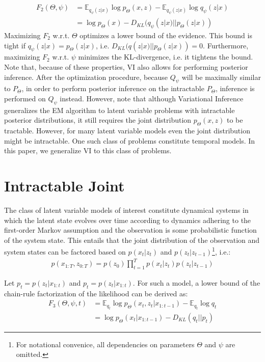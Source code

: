 \begin{align*}
F_{2}(\Theta, \psi) &= \mathbb{E}_{q_\psi(z|x)} \log p_\Theta(x,z) - \mathbb{E}_{q_\psi(z|x)} \log q_\psi(z|x)\\
&=  \log p_\Theta(x) - D_{KL}(q_\psi(z|x) || p_\Theta(z|x))
\end{align*}
Maximizing $F_2$ w.r.t. $\Theta$ optimizes a lower bound of the evidence. This bound is tight if  $q_\psi(z|x)=p_\Theta(z|x)$, i.e. $D_{KL}(q(z|x) || p_\Theta(z|x)) = 0$. Furthermore, maximizing $F_2$ w.r.t. $\psi$ minimizes the KL-divergence, i.e. it tightens the bound. Note that, because of these properties, VI also allows for performing posterior inference. After the optimization procedure, because $Q_\psi$ will be maximally similar to $P_\Theta$, in order to perform posterior inference on the intractable $P_\Theta$, inference is performed on $Q_\psi$ instead. However, note that although Variational Inference generalizes the EM algorithm to latent variable problems with intractable posterior distributions, it still requires the joint distribution $p_\Theta(x,z)$ to be tractable. However, for many latent variable models even the joint distribution might be intractable. One such class of problems constitute temporal models. In this paper, we generalize VI to this class of problems.

\section{Intractable Joint}

The class of latent variable models of interest constitute dynamical systems in which the latent state evolves over time according to dynamics adhering to the first-order Markov assumption and the observation is some probabilistic function of the system state. This entails that the joint distribution of the observation and system states can be factored based on $p(x_t | z_t)$ and $p(z_t|z_{t-1})$\footnote{For notational convenice, all dependencies on parameters $\Theta$ and $\psi$ are omitted.}, i.e.:
\begin{align*}
p(x_{1:T}, z_{0:T}) = p(z_0) \prod_{t=1}^T p(x_t | z_t) p(z_t|z_{t-1})
\end{align*}

Let $p_t = p(z_t|x_{1:t})$ and $p_t = p(z_t|x_{1:t})$. For such a model, a lower bound of the chain-rule factorization of the likelihood can be derived as:
\begin{align}
F_{3}(\Theta, \psi, t) &= \mathbb{E}_{q_t} \log p_\Theta(x_t,z_t|x_{1:t-1}) - \mathbb{E}_{q_t} \log q_t \label{f3}\\
&=  \log p_\Theta(x_t|x_{1:t-1}) - D_{KL}(q_t || p_t)
\end{align}


